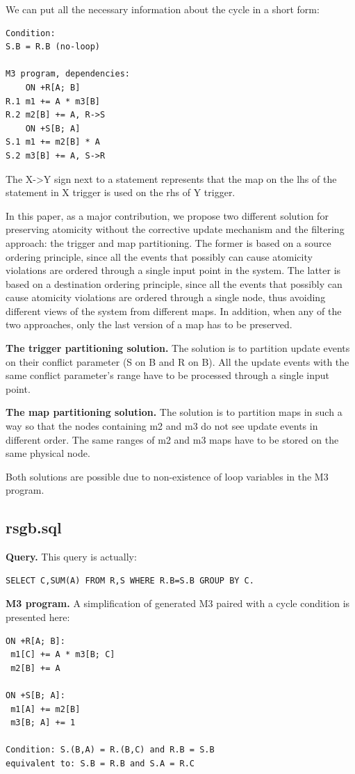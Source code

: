 \documentclass{sig-semester}
\begin{document}
We can put all the necessary information about the cycle in a short form:
\begin{verbatim}
Condition: 
S.B = R.B (no-loop)

M3 program, dependencies:
    ON +R[A; B] 
R.1 m1 += A * m3[B]
R.2 m2[B] += A, R->S
    ON +S[B; A] 
S.1 m1 += m2[B] * A
S.2 m3[B] += A, S->R
\end{verbatim}
The X->Y sign next to a statement represents that the map on the lhs of the statement in X trigger is used on the rhs of Y trigger.

In this paper, as a major contribution, we propose two different solution for preserving atomicity without the corrective update mechanism and the filtering approach: the trigger and map partitioning. The former is based on a source ordering principle, since all the events that possibly can cause atomicity violations are ordered through a single input point in the system. The latter is based on a destination ordering principle, since all the events that possibly can cause atomicity violations are ordered through a single node, thus avoiding different views of the system from different maps. In addition, when any of the two approaches, only the last version of a map has to be preserved.

\textbf{The trigger partitioning solution.} The solution is to partition update events on their conflict parameter (S on B and R on B). All the update events with the same conflict parameter's range have to be processed through a single input point.

\textbf{The map partitioning solution.} The solution is to partition maps in such a way so that the nodes containing m2 and m3 do not see update events in different order. The same ranges of m2 and m3 maps have to be stored on the same physical node.

Both solutions are possible due to non-existence of loop variables in the M3 program.

\subsection{rsgb.sql}
\textbf{Query.} This query is actually:
\begin{verbatim}
SELECT C,SUM(A) FROM R,S WHERE R.B=S.B GROUP BY C.
\end{verbatim}

\newpage
\textbf{M3 program.} A simplification of generated M3 paired with a cycle condition is presented here:
\begin{verbatim}
ON +R[A; B]:
 m1[C] += A * m3[B; C]
 m2[B] += A

ON +S[B; A]: 
 m1[A] += m2[B]
 m3[B; A] += 1

Condition: S.(B,A) = R.(B,C) and R.B = S.B
equivalent to: S.B = R.B and S.A = R.C
\end{verbatim}
\end{document}
